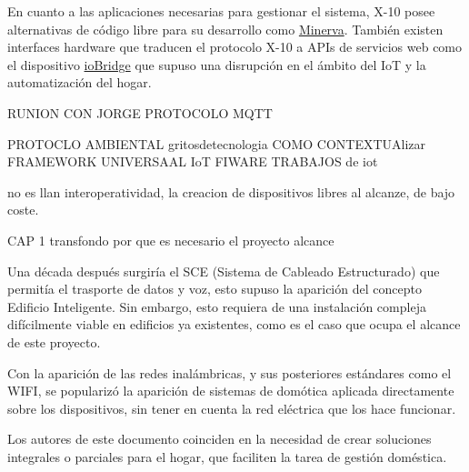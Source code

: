 En cuanto a las aplicaciones necesarias para gestionar el sistema, X-10 posee alternativas de código libre para su desarrollo como \href{http://www.minervahome.net/}{Minerva}. También existen interfaces hardware que traducen el protocolo X-10 a APIs de servicios web como el dispositivo \href{http://www.iobridge.com/}{ioBridge} que supuso una disrupción en el ámbito del IoT y la automatización del hogar.

RUNION CON JORGE
PROTOCOLO MQTT

PROTOCLO AMBIENTAL gritosdetecnologia
COMO CONTEXTUAlizar
FRAMEWORK UNIVERSAAL IoT
FIWARE
TRABAJOS de iot

no es llan interoperatividad, la creacion de dispositivos libres al alcanze, de bajo coste.

CAP 1
transfondo
por que es necesario el proyecto
alcance


Una década después surgiría el SCE (Sistema de Cableado Estructurado) que permitía el trasporte de datos y voz, esto supuso la aparición del concepto Edificio Inteligente. Sin embargo, esto requiera de una instalación compleja difícilmente viable en edificios ya existentes, como es el caso que ocupa el alcance de este proyecto.

Con la aparición de las redes inalámbricas, y sus posteriores estándares como el WIFI, se popularizó la aparición de sistemas de domótica aplicada directamente sobre los dispositivos, sin tener en cuenta la red eléctrica que los hace funcionar.

Los autores de este documento coinciden en la necesidad de crear soluciones integrales o parciales para el hogar, que faciliten la tarea de gestión doméstica.
